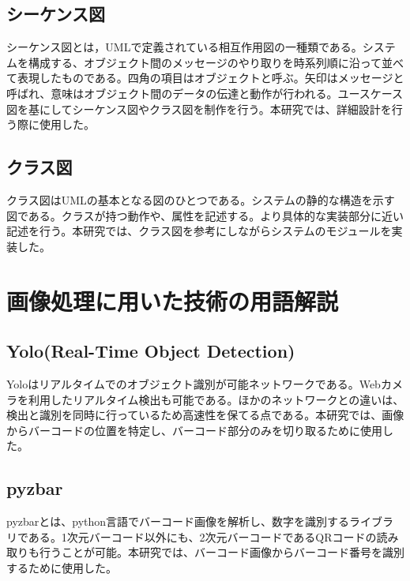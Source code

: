 \subsection*{シーケンス図}
シーケンス図とは，UMLで定義されている相互作用図の一種類である。システムを構成する、オブジェクト間のメッセージのやり取りを時系列順に沿って並べて表現したものである。四角の項目はオブジェクトと呼ぶ。矢印はメッセージと呼ばれ、意味はオブジェクト間のデータの伝達と動作が行われる。ユースケース図を基にしてシーケンス図やクラス図を制作を行う。本研究では、詳細設計を行う際に使用した。

\subsection*{クラス図}
クラス図はUMLの基本となる図のひとつである。システムの静的な構造を示す図である。クラスが持つ動作や、属性を記述する。より具体的な実装部分に近い記述を行う。本研究では、クラス図を参考にしながらシステムのモジュールを実装した。

\section{画像処理に用いた技術の用語解説}

\subsection*{Yolo(Real-Time Object Detection)}
Yoloはリアルタイムでのオブジェクト識別が可能ネットワークである。Webカメラを利用したリアルタイム検出も可能である。ほかのネットワークとの違いは、検出と識別を同時に行っているため高速性を保てる点である\cite{yolo}。本研究では、画像からバーコードの位置を特定し、バーコード部分のみを切り取るために使用した。


\subsection*{pyzbar}
pyzbarとは、python言語でバーコード画像を解析し、数字を識別するライブラリである\cite{pyzbar}。1次元バーコード以外にも、2次元バーコードであるQRコードの読み取りも行うことが可能。本研究では、バーコード画像からバーコード番号を識別するために使用した。